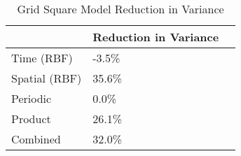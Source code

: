 \begin{table}[]
\centering
\caption{Grid Square Model Reduction in Variance}
\label{variance_grid}
\begin{tabular}{@{}lll@{}}
\toprule
              & Reduction in Variance &  \\ \midrule
Time (RBF)    & -3.5\%                &  \\
Spatial (RBF) & 35.6\%                &  \\
Periodic      & 0.0\%                 &  \\
Product       & 26.1\%                &  \\
Combined      & 32.0\%                &  \\ \bottomrule
\end{tabular}
\end{table}
